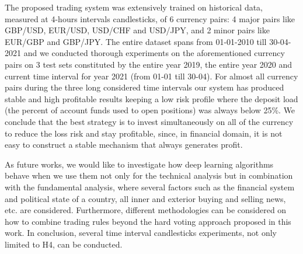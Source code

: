 \documentclass[1p]{elsarticle}
\begin{document}
The proposed trading system was extensively trained on historical data, measured at 4-hours intervals candlesticks, of 6 currency pairs: 4 major pairs like GBP/USD, EUR/USD, USD/CHF and USD/JPY, and 2 minor pairs like EUR/GBP and GBP/JPY. The entire dataset spans from 01-01-2010 till 30-04-2021 and we conducted thorough experiments on the aforementioned currency pairs on 3 test sets constituted by the entire year 2019, the entire year 2020 and current time interval for year 2021 (from 01-01 till 30-04). 
For almost all currency pairs during the three long considered time intervals our system has produced stable and high profitable results 
keeping a low risk profile where the deposit load (the percent of account funds used to open positions) was always below 25\%. We conclude that the best strategy is to invest simultaneously on all of the currency to reduce the loss risk and stay profitable, since, in financial domain, it is not easy to construct a stable mechanism that always generates profit.

As future works, we would like to investigate how deep learning algorithms behave when we use them not only for the technical analysis but in combination with the fundamental analysis, where several  factors such as the financial system and political state of a country, all inner and exterior buying and selling news, etc. are considered. Furthermore, different methodologies can be considered on how to combine trading rules beyond the hard voting approach proposed in this work.
In conclusion, several time interval candlesticks experiments, not only limited to H4, can be conducted.




\end{document}
